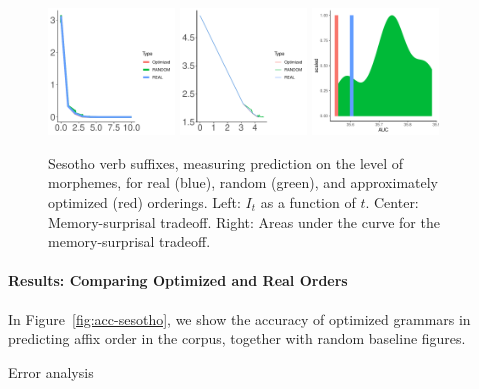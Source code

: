 \begin{figure}
	\begin{center}
\includegraphics[width=0.3\textwidth]{figures/Sesotho-suffixes-byMorphemes-it.pdf}
\includegraphics[width=0.3\textwidth]{figures/Sesotho-suffixes-byMorphemes-memsurp.pdf}
\includegraphics[width=0.3\textwidth]{figures/Sesotho-suffixes-byMorphemes-auc-hist.pdf}
\end{center}
	\caption{Sesotho verb suffixes, measuring prediction on the level of morphemes, for real (blue), random (green), and approximately optimized (red) orderings. Left: $I_t$ as a function of $t$. Center: Memory-surprisal tradeoff. Right: Areas under the curve for the memory-surprisal tradeoff.}\label{fig:jap-morph}
\end{figure}


\paragraph{Results: Comparing Optimized and Real Orders}

In Figure~\ref{fig:acc-sesotho}, we show the accuracy of optimized grammars in predicting affix order in the corpus, together with random baseline figures.



Error analysis

